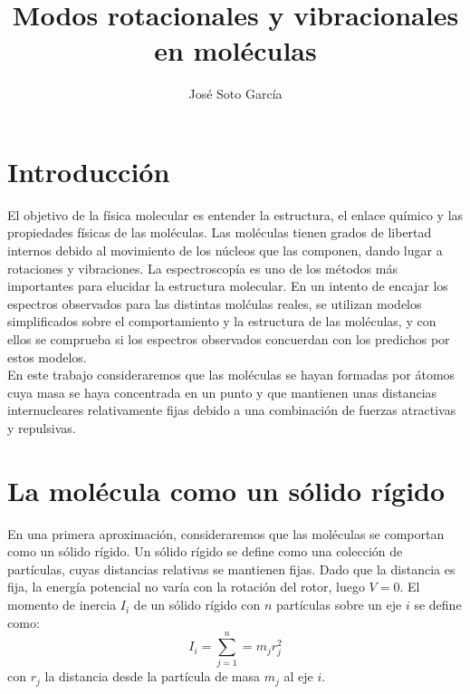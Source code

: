 \documentclass[a4paper]{article}
\title{Modos rotacionales y vibracionales en moléculas}
\author{José Soto García}
\begin{document}
\maketitle
\newpage
\tableofcontents
\newpage
\nocite{haken2013}
\nocite{levine1980}
\nocite{marion2013}
\nocite{wilson1980}


\section{Introducción}
El objetivo de la física molecular es entender la estructura, el enlace químico y las propiedades físicas de las moléculas. Las moléculas tienen grados de libertad internos debido al movimiento de los núcleos que las componen, dando lugar a rotaciones y vibraciones. La espectroscopía es uno de los métodos más importantes para elucidar la estructura molecular. En un intento de encajar los espectros observados para las distintas molćulas reales, se utilizan modelos simplificados sobre el comportamiento y la estructura de las moléculas, y con ellos se comprueba si los espectros observados concuerdan con los predichos por estos modelos.\\

En este trabajo consideraremos que las moléculas se hayan formadas por átomos cuya masa se haya concentrada en un punto y que mantienen unas distancias internucleares relativamente fijas debido a una combinación de fuerzas atractivas y repulsivas.

\section{La molécula como un sólido rígido}
En una primera aproximación, consideraremos que las moléculas se comportan como un sólido rígido. Un sólido rígido se define como una colección de partículas, cuyas distancias relativas se mantienen fijas. Dado que la distancia es fija, la energía potencial no varía con la rotación del rotor, luego $V=0$. El momento de inercia $I_i$ de un sólido rígido con $n$ partículas sobre un eje $i$ se define como:
\begin{equation}
I_i= \sum_{j=1}^n=m_jr_j^2
\end{equation}
con $r_j$ la distancia desde la partícula de masa $m_j$ al eje $i$.
\end{document}
